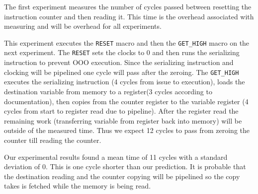 The first experiment measures the number of cycles passed between resetting the instruction counter and then reading it.
This time is the overhead associated with measuring and will be overhead for all experiments.

This experiment executes the {\tt RESET} macro and then the {\tt GET\_HIGH} macro on the next experiment.
The {\tt RESET} sets the clocks to 0 and then runs the serializing instruction to prevent OOO execution.
Since the serializing instruction and clocking will be pipelined one cycle will pass after the zeroing.
The {\tt GET\_HIGH} executes the serializing instruction (4 cycles from issue to execution), loads the destination variable from memory to a register(3 cycles according to documentation), then copies from the counter register to the variable register (4 cycles from start to register read due to pipeline).
After the register read the remaining work (transferring variable from register back into memory) will be outside of the measured time.
Thus we expect 12 cycles to pass from zeroing the counter till reading the counter.

Our experimental results found a mean time of 11 cycles with a standard deviation of 0.
This is one cycle shorter than our prediction.
It is probable that the destination reading and the counter copying will be pipelined so the copy takes is fetched while the memory is being read. 
